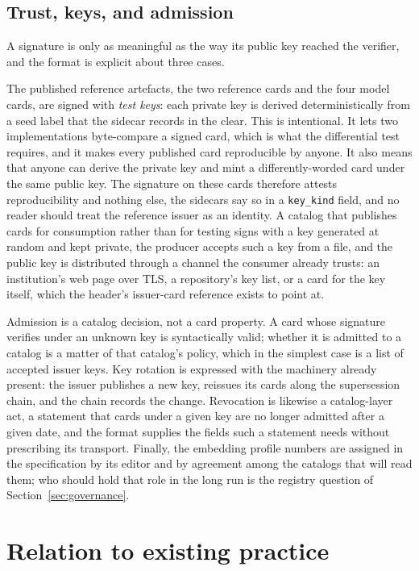\documentclass[11pt]{article}
\begin{document}
\subsection{Trust, keys, and admission}
\label{sec:trust}

A signature is only as meaningful as the way its public key reached the
verifier, and the format is explicit about three cases.

The published reference artefacts, the two reference cards and the four
model cards, are signed with \emph{test keys}: each private key is derived
deterministically from a seed label that the sidecar records in the clear.
This is intentional. It lets two implementations byte-compare a signed card,
which is what the differential test requires, and it makes every published
card reproducible by anyone. It also means that anyone can derive the private
key and mint a differently-worded card under the same public key. The
signature on these cards therefore attests reproducibility and nothing else,
the sidecars say so in a \texttt{key\_kind} field, and no reader should treat
the reference issuer as an identity. A catalog that publishes cards for
consumption rather than for testing signs with a key generated at random and
kept private, the producer accepts such a key from a file, and the public key
is distributed through a channel the consumer already trusts: an
institution's web page over TLS, a repository's key list, or a card for the
key itself, which the header's issuer-card reference exists to point at.

Admission is a catalog decision, not a card property. A card whose signature
verifies under an unknown key is syntactically valid; whether it is admitted
to a catalog is a matter of that catalog's policy, which in the simplest case
is a list of accepted issuer keys. Key rotation is expressed with the
machinery already present: the issuer publishes a new key, reissues its cards
along the supersession chain, and the chain records the change. Revocation
is likewise a catalog-layer act, a statement that cards under a given key are
no longer admitted after a given date, and the format supplies the fields
such a statement needs without prescribing its transport. Finally, the
embedding profile numbers are assigned in the specification by its editor and
by agreement among the catalogs that will read them; who should hold that
role in the long run is the registry question of Section~\ref{sec:governance}.

\section{Relation to existing practice}
\label{sec:related}
\end{document}
